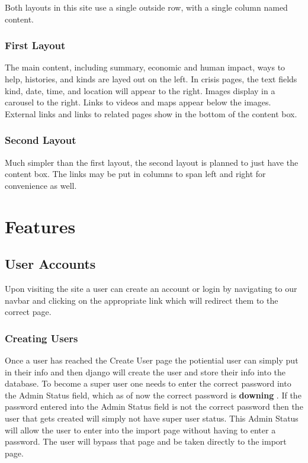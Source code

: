 \documentclass[12pt]{report}
\begin{document}
Both layouts in this site use a single outside row, with a single column named content.
\\


\subsubsection*{First Layout}
The main content, including summary, economic and human impact,
ways to help, histories, and kinds are layed out on the left.
In crisis pages, the text fields kind, date, time, and location will appear to the right.
Images display in a carousel to the right.
Links to videos and maps appear below the images.
External links and links to related pages show in the bottom of the content box.
\\


\subsubsection*{Second Layout}
Much simpler than the first layout, the second layout is planned to just have the content box.
The links may be put in columns to span left and right for convenience as well.
\\


\newpage
\section*{Features}
\hfill


\subsection*{User Accounts}
\hfill
Upon visiting the site a user can create an account or login by navigating to our navbar and clicking on the appropriate link which will redirect them to the correct page.

\subsubsection*{Creating Users}

Once a user has reached the Create User page the potiential user can simply put in their info and then django will create the user and store their info into the database.
To become a super user one needs to enter the correct password into the Admin Status field, which as of now the correct password is  \textbf{downing} . If the password entered into the
Admin Status field is not the correct password then the user that gets created will simply not have super user status. This Admin Status will allow the user to enter into the import page without having to enter a password. The user will bypass that page and be taken directly to the import page.
\\
\end{document}
